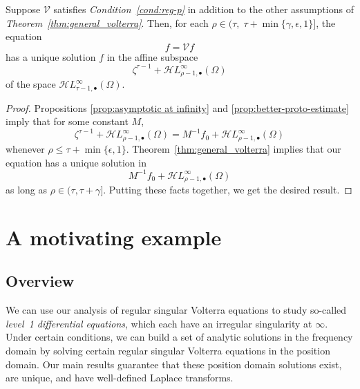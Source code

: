 \documentclass[final]{siamart220329}
\newcommand{\singexp}[2]{\mathcal{H}L^\infty_{#1, #2}}
\newcommand{\singexpalg}[1]{\singexp{#1}{\bullet}}
\newcommand{\volterra}{\mathcal{V}}
\newcommand{\solproto}{f_0}
\newcommand{\domain}{\Omega}
\begin{document}
\begin{proposition}\label{prop:alt-general_volterra}
Suppose $\volterra$ satisfies {\em Condition~\eqref{cond:reg-p}} in addition to the other assumptions of {\em Theorem~\ref{thm:general_volterra}}. Then, for each $\rho \in (\tau,\;\tau + \min\{\gamma, \epsilon, 1\}]$, the equation
\[f = \volterra f\]
has a unique solution $f$ in the affine subspace
\[ \zeta^{\tau-1}+\singexpalg{\rho-1}(\domain) \]
of the space $\singexpalg{\tau-1}(\domain)$.
\end{proposition}
\begin{proof}
Propositions \ref{prop:asymptotic at infinity} and \ref{prop:better-proto-estimate} imply that for some constant $M$,
\[ \zeta^{\tau-1} + \singexpalg{\rho-1}(\domain) = M^{-1}\solproto + \singexpalg{\rho-1}(\domain) \]
whenever $\rho \le \tau + \min\{\epsilon, 1\}$. Theorem~\ref{thm:general_volterra} implies that our equation has a unique solution in
\[ M^{-1}\solproto + \singexpalg{\rho-1}(\domain) \]
as long as $\rho \in (\tau, \tau + \gamma]$. Putting these facts together, we get the desired result.
\end{proof}
\section{A motivating example}\label{sec:example}
\subsection{Overview}
We can use our analysis of regular singular Volterra equations to study so-called \textit{level~1 differential equations}, which each have an irregular singularity at $\infty$. Under certain conditions, we can build a set of analytic solutions in the frequency domain by solving certain regular singular Volterra equations in the position domain. Our main results guarantee that these position domain solutions exist, are unique, and have well-defined Laplace transforms.
\end{document}
